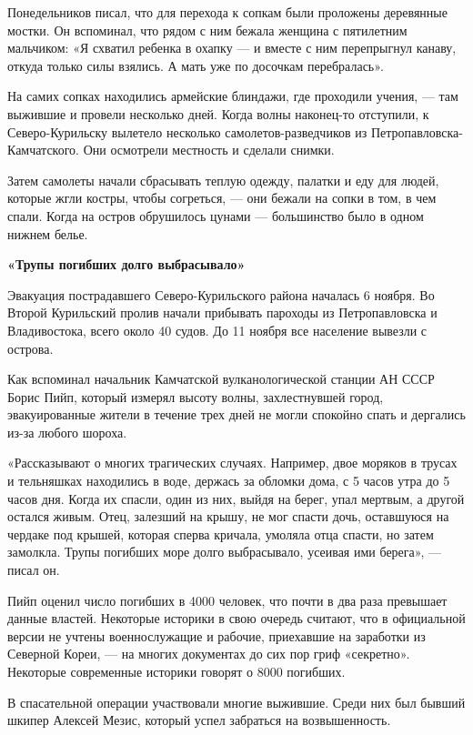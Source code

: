 Понедельников писал, что для перехода к сопкам были проложены деревянные мостки. Он вспоминал, что рядом с ним бежала женщина с пятилетним мальчиком: «Я схватил ребенка в охапку --- и вместе с ним перепрыгнул канаву, откуда только силы взялись. А мать уже по досочкам перебралась».

На самих сопках находились армейские блиндажи, где проходили учения, --- там выжившие и провели несколько дней. Когда волны наконец-то отступили, к Северо-Курильску вылетело несколько самолетов-разведчиков из Петропавловска-Камчатского. Они осмотрели местность и сделали снимки.

Затем самолеты начали сбрасывать теплую одежду, палатки и еду для людей, которые жгли костры, чтобы согреться, --- они бежали на сопки в том, в чем спали. Когда на остров обрушилось цунами --- большинство было в одном нижнем белье.

\textbf{«Трупы погибших долго выбрасывало»}

Эвакуация пострадавшего Северо-Курильского района началась 6 ноября. Во Второй Курильский пролив начали прибывать пароходы из Петропавловска и Владивостока, всего около 40 судов. До 11 ноября все население вывезли с острова.

Как вспоминал начальник Камчатской вулканологической станции АН СССР Борис Пийп, который измерял высоту волны, захлестнувшей город, эвакуированные жители в течение трех дней не могли спокойно спать и дергались из-за любого шороха.

«Рассказывают о многих трагических случаях. Например, двое моряков в трусах и тельняшках находились в воде, держась за обломки дома, с 5 часов утра до 5 часов дня. Когда их спасли, один из них, выйдя на берег, упал мертвым, а другой остался живым. Отец, залезший на крышу, не мог спасти дочь, оставшуюся на чердаке под крышей, которая сперва кричала, умоляла отца спасти, но затем замолкла. Трупы погибших море долго выбрасывало, усеивая ими берега», --- писал он.

Пийп оценил число погибших в 4000 человек, что почти в два раза превышает данные властей. Некоторые историки в свою очередь считают, что в официальной версии не учтены военнослужащие и рабочие, приехавшие на заработки из Северной Кореи, --- на многих документах до сих пор гриф «секретно». Некоторые современные историки говорят о 8000 погибших.

В спасательной операции участвовали многие выжившие. Среди них был бывший шкипер Алексей Мезис, который успел забраться на возвышенность.

